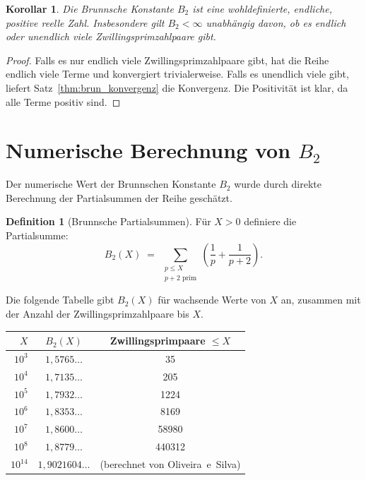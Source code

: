 \documentclass[12pt,a4paper]{amsart}
\newtheorem{korollar}[theorem]{Korollar}
\theoremstyle{definition}
\newtheorem{definition}[theorem]{Definition}
\begin{document}
\begin{korollar}\label{kor:brun_endlich}
  Die Brunnsche Konstante $B_2$ ist eine wohldefinierte, endliche, positive
  reelle Zahl.  Insbesondere gilt $B_2 < \infty$ unabhängig davon, ob es
  endlich oder unendlich viele Zwillingsprimzahlpaare gibt.
\end{korollar}

\begin{proof}
  Falls es nur endlich viele Zwillingsprimzahlpaare gibt, hat die Reihe
  endlich viele Terme und konvergiert trivialerweise.  Falls es unendlich
  viele gibt, liefert Satz~\ref{thm:brun_konvergenz} die Konvergenz.
  Die Positivität ist klar, da alle Terme positiv sind.
\end{proof}

\section{Numerische Berechnung von \texorpdfstring{$B_2$}{B2}}
\label{sec:numerik}

Der numerische Wert der Brunnschen Konstante $B_2$ wurde durch direkte
Berechnung der Partialsummen der Reihe geschätzt.

\begin{definition}[Brunnsche Partialsummen]
  Für $X > 0$ definiere die Partialsumme:
  \[
    B_2(X) \;=\; \sum_{\substack{p \leq X \\ p+2\text{ prim}}}
                  \left(\frac{1}{p} + \frac{1}{p+2}\right).
  \]
\end{definition}

Die folgende Tabelle gibt $B_2(X)$ für wachsende Werte von $X$ an,
zusammen mit der Anzahl der Zwillingsprimzahlpaare bis $X$.

\begin{center}
\begin{tabular}{rcc}
\toprule
$X$ & $B_2(X)$ & Zwillingsprimpaare $\leq X$ \\
\midrule
$10^3$   & $1{,}5765\ldots$  & 35   \\
$10^4$   & $1{,}7135\ldots$  & 205  \\
$10^5$   & $1{,}7932\ldots$  & 1224 \\
$10^6$   & $1{,}8353\ldots$  & 8169 \\
$10^7$   & $1{,}8600\ldots$  & 58980 \\
$10^8$   & $1{,}8779\ldots$  & 440312 \\
$10^{14}$ & $1{,}9021604\ldots$ & (berechnet von Oliveira~e~Silva) \\
\bottomrule
\end{tabular}
\end{center}
\end{document}
